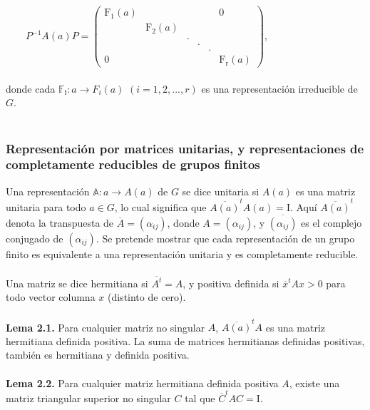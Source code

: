 \documentclass[12pt]{book}
\theoremstyle{definition}
\newcounter{in}
\newcounter{ini}
\begin{document}
$\qquad 
P^{-1}A\left(a\right)P=
\begin{pmatrix}
\mathrm{F_{1}}\left(a\right) & & & & & 0\\
 & \mathrm{F_{2}}\left(a\right) & & & & \\
 & & . & & & \\
 & & & . & & \\
 & & & & . & \\
0 & & & & & \mathrm{F_{r}}\left(a\right)
\end{pmatrix}$,\\~\\
donde cada $\mathbb{F_{i}}: a \rightarrow F_{i}\left(a\right)$ $\left(i=1,2,...,r\right)$ es una representación irreducible de $G$.\\~\\

\subsubsection{Representación por matrices unitarias, y representaciones de completamente reducibles de grupos finitos}
Una representación $\mathbb{A}: a \rightarrow A\left(a\right)$ de $G$  se dice unitaria si $A\left(a\right)$ es una matriz unitaria para todo $a \in G$, lo cual significa que $\overline{A\left(a\right)}^{t}A\left(a\right)=\mathrm{I}$. Aquí $\overline{A\left(a\right)}^{t}$ denota la transpuesta de $\overline{A}=\left(\alpha_{ij}\right)$, donde $A=\left(\alpha_{ij}\right)$, y $\overline{\left(\alpha_{ij}\right)}$ es el complejo conjugado de $\left(\alpha_{ij}\right)$. Se pretende mostrar que cada representación de un grupo finito es equivalente a una representación unitaria y es completamente reducible.\\~\\
Una matriz se dice hermitiana si $\overline{A^{t}}=A$, y positiva definida si $\overline{x}^{t}Ax>0$ para todo vector columna $x$ (distinto de cero).\\~\\
\textbf{Lema 2.1.} Para cualquier matriz no singular $A$, $\overline{A\left(a\right)}^{t}A$ es una matriz hermitiana definida positiva. La suma de matrices hermitianas definidas positivas, también es hermitiana y definida positiva.\\~\\
\textbf{Lema 2.2.} Para cualquier matriz hermitiana definida positiva $A$, existe una matriz triangular superior no singular $C$ tal que $\overline{C}^{t}AC=\mathrm{I}$.\\~\\
\end{document}
